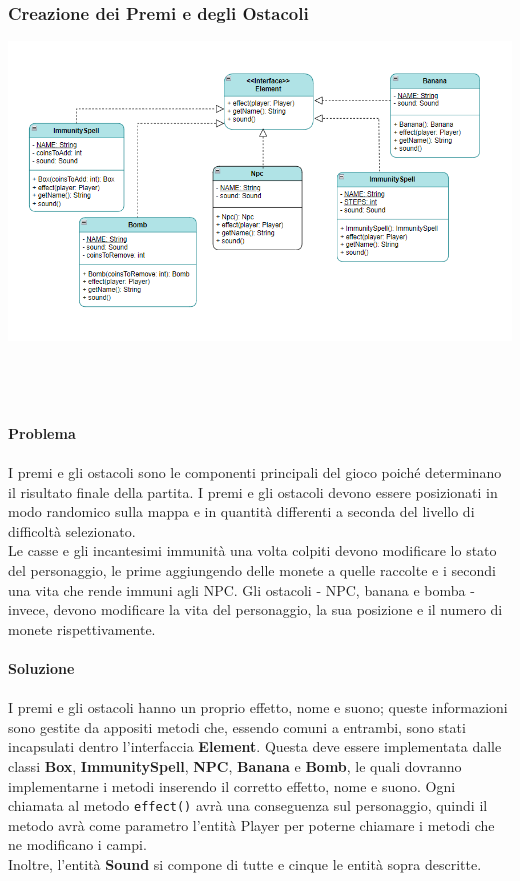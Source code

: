 \documentclass[12pt, letterpaper]{article}
\begin{document}
        \subsubsection{Creazione dei Premi e degli Ostacoli}
            \includegraphics[width=\textwidth]{element.png}
            \\ \\ \\ \\ \\
            \textbf{Problema}
            \\ \\
            I premi e gli ostacoli sono le componenti principali del gioco poiché determinano il risultato finale della partita. I premi e gli ostacoli devono essere posizionati in modo randomico sulla mappa e in quantità differenti a seconda del livello di difficoltà selezionato. \\
            Le casse e gli incantesimi immunità una volta colpiti devono modificare lo stato del personaggio, le prime aggiungendo delle monete a quelle raccolte e i secondi una vita che rende immuni agli NPC. Gli ostacoli - NPC, banana e bomba - invece, devono modificare la vita del personaggio, la sua posizione e il numero di monete rispettivamente.
            \\ \\
            \textbf{Soluzione} 
            \\ \\
            I premi e gli ostacoli hanno un proprio effetto, nome e suono; queste informazioni sono gestite da appositi metodi che, essendo comuni a entrambi, sono stati incapsulati dentro l'interfaccia \textbf{Element}. Questa deve essere implementata dalle classi \textbf{Box}, \textbf{ImmunitySpell}, \textbf{NPC}, \textbf{Banana} e \textbf{Bomb}, le quali dovranno implementarne i metodi inserendo il corretto effetto, nome e suono. Ogni chiamata al metodo \verb|effect()| avrà una conseguenza sul personaggio, quindi il metodo avrà come parametro l'entità Player per poterne chiamare i metodi che ne modificano i campi.
            \\
            Inoltre, l'entità \textbf{Sound} si compone di tutte e cinque le entità sopra descritte.
            \\
\end{document}
